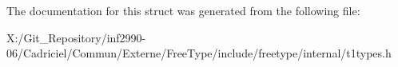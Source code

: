 The documentation for this struct was generated from the following file\-:\begin{DoxyCompactItemize}
\item 
X\-:/\-Git\-\_\-\-Repository/inf2990-\/06/\-Cadriciel/\-Commun/\-Externe/\-Free\-Type/include/freetype/internal/t1types.\-h\end{DoxyCompactItemize}
